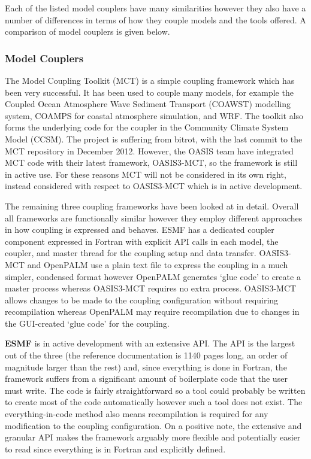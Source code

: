 \documentclass{acm_proc_article-sp}
\begin{document}
Each of the listed model couplers have many similarities however they also have
a number of differences in terms of how they couple models and the tools
offered. A comparison of model couplers is given below.

\subsubsection{Model Couplers}

The Model Coupling Toolkit (MCT) \cite{Larson2005,Jacob2005} is a simple
coupling framework which has been very successful. It has been used to couple
many models, for example the Coupled Ocean Atmosphere Wave Sediment Transport
(COAWST) modelling system, COAMPS for coastal atmosphere simulation, and WRF.
The toolkit also forms the underlying code for the coupler in the Community
Climate System Model (CCSM). The project is suffering from bitrot, with the last
commit to the MCT repository in December 2012. However, the OASIS team have
integrated MCT code with their latest framework, OASIS3-MCT, so the framework is
still in active use. For these reasons MCT will not be considered in its own
right, instead considered with respect to OASIS3-MCT which is in active
development.

The remaining three coupling frameworks have been looked at in detail. Overall
all frameworks are functionally similar however they employ different approaches
in how coupling is expressed and behaves. ESMF has a dedicated coupler component
expressed in Fortran with explicit API calls in each model, the coupler, and
master thread for the coupling setup and data transfer. OASIS3-MCT and OpenPALM
use a plain text file to express the coupling in a much simpler, condensed
format however OpenPALM generates `glue code' to create a master process whereas
OASIS3-MCT requires no extra process. OASIS3-MCT allows changes to be made to
the coupling configuration without requiring recompilation whereas OpenPALM may
require recompilation due to changes in the GUI-created `glue code' for the
coupling.

\textbf{ESMF} is in active development with an extensive API. The API is the
largest out of the three (the reference documentation is 1140 pages long, an
order of magnitude larger than the rest) and, since everything is done in
Fortran, the framework suffers from a significant amount of boilerplate code
that the user must write. The code is fairly straightforward so a tool could
probably be written to create most of the code automatically however such a tool
does not exist. The everything-in-code method also means recompilation is
required for any modification to the coupling configuration. On a positive note,
the extensive and granular API makes the framework arguably more flexible and
potentially easier to read since everything is in Fortran and explicitly
defined.
\end{document}
